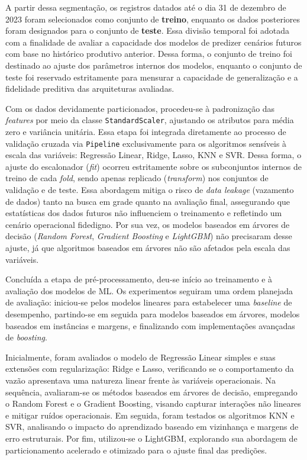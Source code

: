 A partir dessa segmentação, os registros datados até o dia 31 de dezembro de 2023 foram selecionados como conjunto de \textbf{treino}, enquanto os dados posteriores foram designados para o conjunto de \textbf{teste}. Essa divisão temporal foi adotada com a finalidade de avaliar a capacidade dos modelos de predizer cenários futuros com base no histórico produtivo anterior. Dessa forma, o conjunto de treino foi destinado ao ajuste dos parâmetros internos dos modelos, enquanto o conjunto de teste foi reservado estritamente para mensurar a capacidade de generalização e a fidelidade preditiva das arquiteturas avaliadas.

Com os dados devidamente particionados, procedeu-se à padronização das \textit{features} por meio da classe \texttt{StandardScaler}, ajustando os atributos para média zero e variância unitária. Essa etapa foi integrada diretamente ao processo de validação cruzada via \texttt{Pipeline} exclusivamente para os algoritmos sensíveis à escala das variáveis: Regressão Linear, Ridge, Lasso, \gls{KNN} e \gls{SVR}. Dessa forma, o ajuste do escalonador (\textit{fit}) ocorreu estritamente sobre os subconjuntos internos de treino de cada \textit{fold}, sendo apenas replicado (\textit{transform}) nos conjuntos de validação e de teste. Essa abordagem mitiga o risco de \textit{data leakage} (vazamento de dados) tanto na busca em grade quanto na avaliação final, assegurando que estatísticas dos dados futuros não influenciem o treinamento e refletindo um cenário operacional fidedigno. Por sua vez, os modelos baseados em árvores de decisão (\textit{Random Forest}, \textit{Gradient Boosting} e \textit{LightGBM}) não precisaram desse ajuste, já que algoritmos baseados em árvores não são afetados pela escala das variáveis.

Concluída a etapa de pré-processamento, deu-se início ao treinamento e à avaliação dos modelos de \gls{ML}. Os experimentos seguiram uma ordem planejada de avaliação: iniciou-se pelos modelos lineares para estabelecer uma \textit{baseline} de desempenho, partindo-se em seguida para modelos baseados em árvores, modelos baseados em instâncias e margens, e finalizando com implementações avançadas de \textit{boosting}.

Inicialmente, foram avaliados o modelo de Regressão Linear simples e suas extensões com regularização: Ridge e Lasso, verificando se o comportamento da vazão apresentava uma natureza linear frente às variáveis operacionais. Na sequência, avaliaram-se os métodos baseados em árvores de decisão, empregando o Random Forest e o Gradient Boosting, visando capturar interações não lineares e mitigar ruídos operacionais. Em seguida, foram testados os algoritmos \gls{KNN} e \gls{SVR}, analisando o impacto do aprendizado baseado em vizinhança e margens de erro estruturais. Por fim, utilizou-se o LightGBM, explorando sua abordagem de particionamento acelerado e otimizado para o ajuste final das predições.

